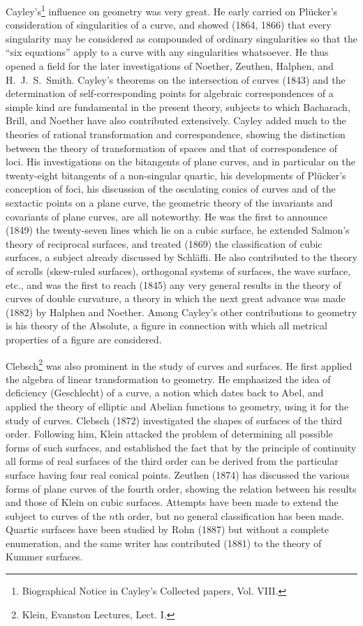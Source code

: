 \documentclass[oneside]{book}
\begin{document}
{Cayley's\footnote{Biographical Notice in Cayley's Collected papers,
Vol. VIII.} influence on geometry was very great. He early carried
on Pl\"ucker's consideration of singularities of a curve, and showed
(1864, 1866) that every singularity may be considered as compounded
of ordinary singularities so that the ``six equations'' apply to a
curve with any singularities whatsoever. He thus opened a field for
the later investigations of Noether, Zeuthen, Halphen, and
H.~J.~S.~Smith. Cayley's theorems on the intersection of curves
(1843) and the determination of self-corresponding points for
algebraic correspondences of a simple kind are fundamental in the
present theory, subjects to which Bacharach, Brill, and Noether have
also contributed extensively. Cayley added much to the theories of
rational transformation and correspondence, showing the distinction
between the theory of transformation of spaces and that of
correspondence of loci. His investigations on the bitangents of
plane curves, and in particular on the twenty-eight bitangents of a
non-singular quartic, his developments of Pl\"ucker's conception of
foci, his discussion of the osculating conics of curves and of the
sextactic points on a plane curve, the geometric theory of the
invariants and covariants of plane curves, are all noteworthy. He
was the first to announce (1849) the twenty-seven lines which lie on
a cubic surface, he extended Salmon's theory of reciprocal surfaces,
and treated (1869) the classification of cubic surfaces, a subject
already discussed by Schl\"afli. He also contributed to the theory
of scrolls (skew-ruled surfaces), orthogonal systems of surfaces,
the wave surface, etc., and was the first to reach (1845) any very
general results in the theory of curves of double curvature, a
theory in which the next great advance was made (1882) by Halphen
and Noether. Among Cayley's other contributions to geometry is his
theory of the Absolute, a figure in connection with which all
metrical properties of a figure are considered.

Clebsch\footnote{Klein, Evanston Lectures, Lect. I.} was also
prominent in the study of curves and surfaces. He first applied the
algebra of linear transformation to geometry. He emphasized the idea
of deficiency (Geschlecht) of a curve, a notion which dates back to
Abel, and applied the theory of elliptic and Abelian functions to
geometry, using it for the study of curves. Clebsch (1872)
investigated the shapes of surfaces of the third order. Following
him, Klein attacked the problem of determining all possible forms of
such surfaces, and established the fact that by the principle of
continuity all forms of real surfaces of the third order can be
derived from the particular surface having four real conical
points. Zeuthen (1874) has discussed the various forms of plane
curves of the fourth order, showing the relation between his results
and those of Klein on cubic surfaces. Attempts have been made to
extend the subject to curves of the $n$th order, but no general
classification has been made. Quartic surfaces have been studied by
Rohn (1887) but without a complete enumeration, and the same writer
has contributed (1881) to the theory of Kummer surfaces.

}
\end{document}
